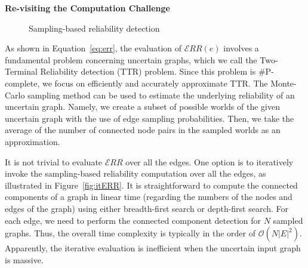 \textbf{Re-visiting the Computation Challenge}~~
\begin{figure}
    \vspace{-10pt}
    \caption{Sampling-based reliability detection}
    \vspace{-5pt}
    \label{fig:computationERR}
\end{figure} 
As shown in Equation~\ref{eq:err},  
the evaluation of $\mathcal{E}RR(e)$ involves a fundamental problem concerning uncertain graphs, which we call 
the Two-Terminal Reliability detection (TTR) problem. 
Since this problem is \#P-complete, we focus on efficiently and accurately approximate TTR.
The Monte-Carlo sampling method can be used to estimate the underlying reliability of an uncertain graph. 
Namely, we create a subset of possible worlds of the given uncertain graph with the use of edge sampling probabilities. 
Then, we take the average of the number of connected node pairs in the sampled worlds as an approximation. 
 
It is not trivial to evaluate $\mathcal{E}RR$ over all the edges. 
One option is to iteratively invoke the sampling-based reliability computation over all the edges, 
as illustrated in Figure~\ref{fig:itERR}. 
It is straightforward to compute the connected components of a graph in linear time (regarding the numbers of the nodes and edges of the graph) using either breadth-first search or depth-first search.
For each edge, we need to perform the connected component detection for $N$ sampled graphs.
Thus, the overall time complexity is typically in the order of $\mathcal{O}( N |E|^{2})$.
Apparently, the iterative evaluation is inefficient when the uncertain input graph is massive.

